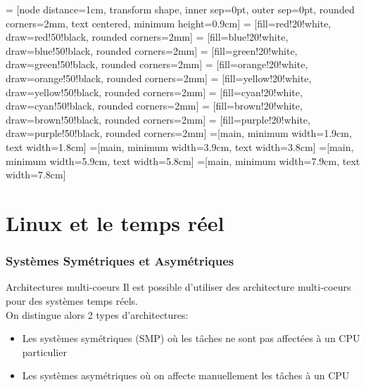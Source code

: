 %
%
%

     = [node distance=1cm, transform shape, inner sep=0pt, outer sep=0pt, rounded corners=2mm, text centered, minimum height=0.9cm]
     = [fill=red!20!white,     draw=red!50!black,     rounded corners=2mm]
    = [fill=blue!20!white,    draw=blue!50!black,    rounded corners=2mm]
   = [fill=green!20!white,   draw=green!50!black,   rounded corners=2mm]
  = [fill=orange!20!white,  draw=orange!50!black,  rounded corners=2mm]
  = [fill=yellow!20!white,  draw=yellow!50!black,  rounded corners=2mm]
    = [fill=cyan!20!white,    draw=cyan!50!black,    rounded corners=2mm]
   = [fill=brown!20!white,   draw=brown!50!black,   rounded corners=2mm]
  = [fill=purple!20!white,  draw=purple!50!black,  rounded corners=2mm]
=[main, minimum width=1.9cm, text width=1.8cm]
=[main, minimum width=3.9cm, text width=3.8cm]
=[main, minimum width=5.9cm, text width=5.8cm]
=[main, minimum width=7.9cm, text width=7.8cm]

\part{Linux et le temps réel}

\begin{frame}
\partpage
\end{frame}

\begin{frame}
\tableofcontents[currentpart]
\end{frame}

\section{Systèmes Symétriques et Asymétriques}

\begin{frame}{Architectures multi-coeurs}
  Il est  possible d'utiliser  des architecture multi-coeurs  pour des
  systèmes temps réels.
  \\
  On distingue alors 2 types d'architectures:
  \begin{itemize}
  \item  Les systèmes  symétriques (SMP)  où  les tâches  ne sont  pas
    affectées à un CPU particulier
  \item  Les  systèmes asymétriques  où  on  affecte manuellement  les
    tâches à un CPU
  \end{itemize}
\end{frame}

